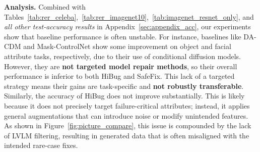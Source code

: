 \documentclass[10pt]{article} %
\newcommand{\model}{SafeFix\xspace}
\newcommand{\hibug}{HiBug\xspace}
\begin{document}
\begin{table}
\centering
\small
\setlength{\tabcolsep}{4pt}
\renewcommand{\arraystretch}{0.95}
\caption{Test accuracy (\%) on ImageNet10 using ResNet-18.}
\label{tab:imagenet_resnet_only}

\vspace{-10pt}
\end{table}




\noindent\textbf{Analysis.}
Combined with Tables~\ref{tab:rer_celeba},~\ref{tab:rer_imagenet10},~\ref{tab:imagenet_resnet_only}, and \emph{all other test-accuracy results} in Appendix~\ref{sec:appendix_acc}, our experiments show that baseline performance is often unstable. For instance, baselines like DA-CDM and Mask-ControlNet show some improvement on object and facial attribute tasks, respectively, due to their use of conditional diffusion models. However, they are \textbf{not targeted model repair methods}, so their overall performance is inferior to both HiBug and \model. This lack of a targeted strategy means their gains are task-specific and \textbf{not robustly transferable}.
Similarly, the accuracy of \hibug{} does not improve substantially. This is likely because it does not precisely target failure-critical attributes; instead, it applies general augmentations that can introduce noise or modify unintended features. As shown in Figure~\ref{fig:picture_compare}, this issue is compounded by the lack of LVLM filtering, resulting in generated data that is often misaligned with the intended rare-case fixes.
\end{document}
